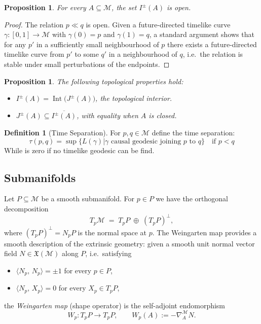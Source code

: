\documentclass[12pt, a4paper]{article}
\theoremstyle{plain}
\newtheorem{proposition}[theorem]{Proposition}
\theoremstyle{definition}
\newtheorem{definition}[theorem]{Definition}
\theoremstyle{remark}
\newcommand{\M}{\mathcal{M}}
\newcommand{\ls}[2]{\langle #1,\, #2 \rangle}
\begin{document}
\begin{proposition}
  For every $A \subseteq \M$, the set $I^{\pm}(A)$ is open.
\end{proposition}

\begin{proof}
  The relation $p \ll q$ is open. Given a future-directed timelike curve
  $\gamma \colon [0,1] \to \M$ with $\gamma(0) = p$ and $\gamma(1) = q$,
  a standard argument shows that for any $p'$ in a sufficiently small
  neighbourhood of $p$ there exists a future-directed timelike curve
  from $p'$ to some $q'$ in a neighbourhood of $q$, i.e.\ the
  relation is stable under small perturbations of the endpoints.
\end{proof}

\begin{proposition}
  The following topological properties hold:
  \begin{itemize}
    \item $I^{\pm}(A) = \operatorname{Int}\bigl(J^{\pm}(A)\bigr)$, the topological interior.
    \item $J^{\pm}(A) \subseteq \overline{I^{\pm}(A)}$, with equality when $A$ is closed.
  \end{itemize}
\end{proposition}

\begin{definition}[Time Separation]
    For $p, q \in \M$ define the time separation:
    \[
    \tau(p,q) = \sup\{L(\gamma) | \gamma \text{ causal geodesic joining } p \text{ to } q\} \quad \text{if } p < q
    \]
    While is zero if no timelike geodesic can be find.
\end{definition}

\subsection{Submanifolds}

Let $P \subseteq \M$ be a smooth submanifold. For $p \in P$ we have
the orthogonal decomposition
\[
  T_p\M \;=\; T_pP \;\oplus\; (T_pP)^\perp,
\]
where $(T_pP)^\perp = N_pP$ is the normal space at $p$. The Weingarten map provides a smooth description of the extrinsic geometry: given a smooth unit normal vector field $N \in \mathfrak{X}(\M)$ along $P$, i.e.\ satisfying
\begin{itemize}
  \item $\ls{N_p}{N_p} = \pm 1$ for every $p \in P$,
  \item $\ls{N_p}{X_p} = 0$ for every $X_p \in T_pP$,
\end{itemize}
the \emph{Weingarten map} (shape operator) is the self-adjoint endomorphism
\[
  W_p \colon T_pP \longrightarrow T_pP, \qquad W_p(A) := -\nabla^{\M}_A N.
\]
\end{document}
